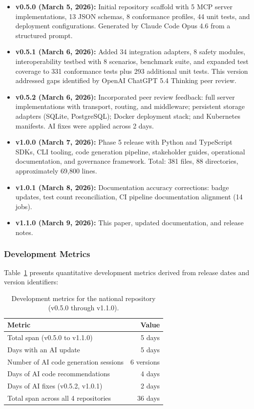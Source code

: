 \documentclass{article}
\begin{document}
\begin{itemize}[leftmargin=*]
\item \textbf{v0.5.0 (March 5, 2026):} Initial repository scaffold with 5 MCP server implementations, 13 JSON schemas, 8 conformance profiles, 44 unit tests, and deployment configurations. Generated by Claude Code Opus 4.6 from a structured prompt.

\item \textbf{v0.5.1 (March 6, 2026):} Added 34 integration adapters, 8 safety modules, interoperability testbed with 8 scenarios, benchmark suite, and expanded test coverage to 331 conformance tests plus 293 additional unit tests. This version addressed gaps identified by OpenAI ChatGPT 5.4 Thinking peer review.

\item \textbf{v0.5.2 (March 6, 2026):} Incorporated peer review feedback: full server implementations with transport, routing, and middleware; persistent storage adapters (SQLite, PostgreSQL); Docker deployment stack; and Kubernetes manifests. AI fixes were applied across 2 days.

\item \textbf{v1.0.0 (March 7, 2026):} Phase 5 release with Python and TypeScript SDKs, CLI tooling, code generation pipeline, stakeholder guides, operational documentation, and governance framework. Total: 381 files, 88 directories, approximately 69,800 lines.

\item \textbf{v1.0.1 (March 8, 2026):} Documentation accuracy corrections: badge updates, test count reconciliation, CI pipeline documentation alignment (14 jobs).

\item \textbf{v1.1.0 (March 9, 2026):} This paper, updated documentation, and release notes.
\end{itemize}

\subsubsection{Development Metrics}

Table~\ref{tab:dev-metrics} presents quantitative development metrics derived from release dates and version identifiers:

\begin{table}[H]
\centering
\caption{Development metrics for the national repository (v0.5.0 through v1.1.0).}
\label{tab:dev-metrics}
\small
\begin{tabular}{@{}lr@{}}
\toprule
\textbf{Metric} & \textbf{Value} \\
\midrule
Total span (v0.5.0 to v1.1.0) & 5 days \\
Days with an AI update & 5 days \\
Number of AI code generation sessions & 6 versions \\
Days of AI code recommendations & 4 days \\
Days of AI fixes (v0.5.2, v1.0.1) & 2 days \\
Total span across all 4 repositories & 36 days \\
\bottomrule
\end{tabular}
\end{table}
\end{document}
